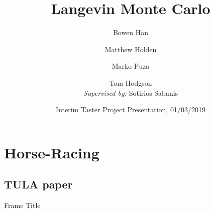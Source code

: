\documentclass[aspectratio=169]{beamer}
\title{Langevin Monte Carlo}
\author{Bowen Han\inst{1} \and Matthew Holden\inst{1} \and Marko Puza\inst{1} \and Tom Hodgson\inst{1}\\ \textit{Supervised by:} Sotirios Sabanis\inst{2}}
\institute[Universities of Somewhere and Elsewhere] %
{
  \inst{1}%
    The Maxwell Institute Graduate School in Analysis \& its Applications
  \and
  \inst{2}%
  University of Edinburgh
}
\date{ Interim Taster Project Presentation, 01/03/2019}
\begin{document}
\begin{frame}
  \titlepage
\end{frame}


\section{Horse-Racing}


\subsection{TULA paper}

\begin{frame}{Frame Title}
    
\end{frame}
\end{document}
